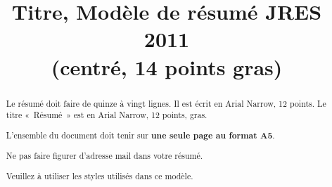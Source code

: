 \documentclass{jres-resume}
\title{Titre, Modèle de résumé JRES 2011\\
(centré, 14 points gras)}
\begin{document}
\maketitle


\begin{abstract}
Le résumé doit faire de quinze à vingt lignes. Il est écrit en Arial
Narrow, 12 points. Le titre «~Résumé~» est en Arial Narrow,
12 points, gras.

L'ensemble du document doit tenir sur \textbf{une seule page au format A5}.

Ne pas faire figurer d'adresse mail dans votre résumé.

Veuillez à utiliser les styles utilisés dans ce modèle.

\end{abstract}
\end{document}
